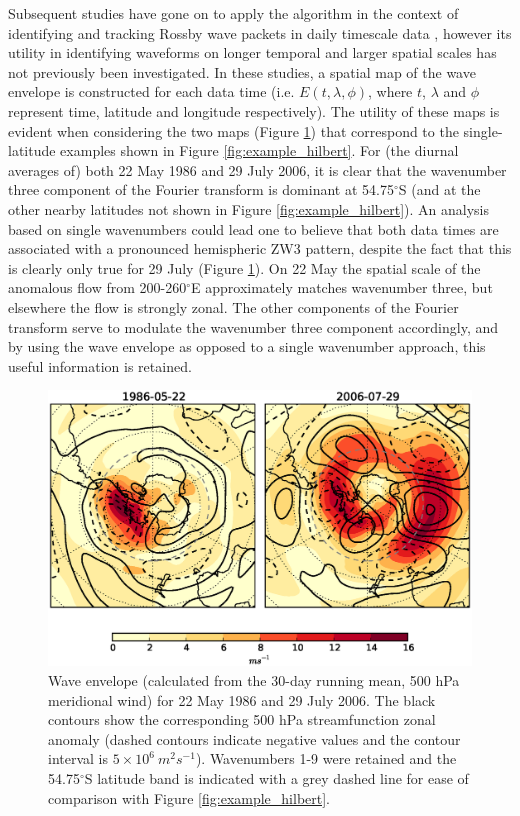 Subsequent studies have gone on to apply the \citet{Zimin2003} algorithm in the context of identifying and tracking Rossby wave packets in daily timescale data \citep{Glatt2014,Souders2014}, however its utility in identifying waveforms on longer temporal and larger spatial scales has not previously been investigated. In these studies, a spatial map of the wave envelope is constructed for each data time (i.e. $E(t,\lambda,\phi)$, where $t$, $\lambda$ and $\phi$ represent time, latitude and longitude respectively). The utility of these maps is evident when considering the two maps (Figure \ref{fig:example_envelope}) that correspond to the single-latitude examples shown in Figure \ref{fig:example_hilbert}. For (the diurnal averages of) both 22 May 1986 and 29 July 2006, it is clear that the wavenumber three component of the Fourier transform is dominant at 54.75$^{\circ}$S (and at the other nearby latitudes not shown in Figure \ref{fig:example_hilbert}). An analysis based on single wavenumbers could lead one to believe that both data times are associated with a pronounced hemispheric ZW3 pattern, despite the fact that this is clearly only true for 29 July (Figure \ref{fig:example_envelope}). On 22 May the spatial scale of the anomalous flow from 200-260$^{\circ}$E approximately matches wavenumber three, but elsewhere the flow is strongly zonal. The other components of the Fourier transform serve to modulate the wavenumber three component accordingly, and by using the wave envelope as opposed to a single wavenumber approach, this useful information is retained.

\begin{figure}
\begin{center}
\includegraphics[width=0.84\columnwidth]{figures/zonalwaves/envva-w19_ERAInterim_500hPa_030day-runmean_native_1986-05-22_2006-07-29.eps}
\caption[Spatial wave envelope field (calculated from the 30-day running mean, 500 hPa meridional wind) for 22 May 1986 and 29 July 2006]{\label{fig:example_envelope}
Wave envelope (calculated from the 30-day running mean, 500 hPa meridional wind) for 22 May 1986 and 29 July 2006. The black contours show the corresponding 500 hPa streamfunction zonal anomaly (dashed contours indicate negative values and the contour interval is $5 \times 10^6 \: m^2 s^{-1}$). Wavenumbers 1-9 were retained and the 54.75$^{\circ}$S latitude band is indicated with a grey dashed line for ease of comparison with Figure \ref{fig:example_hilbert}. %
}
\end{center}
\end{figure}


